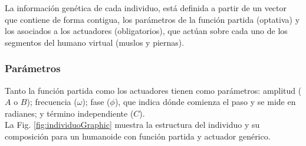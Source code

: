 \documentclass{article}
\begin{document}
La informaci\'on gen\'etica de cada individuo, est\'a definida a partir de un vector que contiene de forma contigua, los par\'ametros de la funci\'on partida (optativa) y los asociados a los actuadores (obligatorios), que act\'uan sobre cada uno de los segmentos del humano virtual (muslos y piernas).  

\subsubsection{Par\'ametros}
\label{sub:parametros}
Tanto la funci\'on partida como los actuadores tienen como par\'ametros: amplitud ($A$ o $B$); frecuencia ($\omega$); fase ($\phi$), que indica d\'onde comienza el paso y se mide en radianes;  y t\'ermino independiente ($C$). \\
La Fig. \ref{fig:individuoGraphic} muestra la estructura del individuo y su composici\'on para un humanoide con funci\'on partida y actuador gen\'erico.\\
\end{document}
